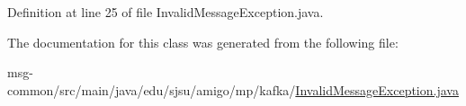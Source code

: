 Definition at line 25 of file Invalid\+Message\+Exception.\+java.



The documentation for this class was generated from the following file\+:\begin{DoxyCompactItemize}
\item 
msg-\/common/src/main/java/edu/sjsu/amigo/mp/kafka/\hyperlink{_invalid_message_exception_8java}{Invalid\+Message\+Exception.\+java}\end{DoxyCompactItemize}
